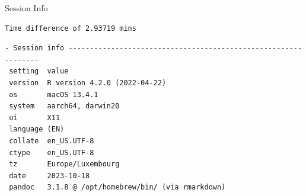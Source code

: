 \documentclass[
  ignorenonframetext,
  aspectratio=169,
]{beamer}
\begin{document}
\begin{frame}[fragile]{Session Info}
\protect\hypertarget{session-info}{}
\linespread{0.5}

\begin{verbatim}
Time difference of 2.93719 mins
\end{verbatim}

\linespread{2}

\linespread{0.5}

\begin{verbatim}
- Session info ---------------------------------------------------------------
 setting  value
 version  R version 4.2.0 (2022-04-22)
 os       macOS 13.4.1
 system   aarch64, darwin20
 ui       X11
 language (EN)
 collate  en_US.UTF-8
 ctype    en_US.UTF-8
 tz       Europe/Luxembourg
 date     2023-10-18
 pandoc   3.1.8 @ /opt/homebrew/bin/ (via rmarkdown)


\end{verbatim}
\end{frame}
\end{document}
